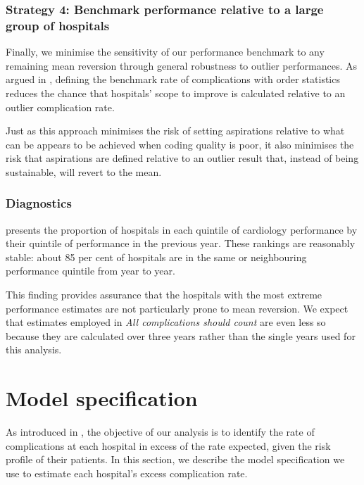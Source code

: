 \documentclass[submission]{grattan}
\newcommand*{\myTitle}{All complications should count}
\begin{document}
\subsubsection{Strategy 4: Benchmark performance relative to a large group of hospitals}\label{subsubsec:strategy-4-benchmark-performance-relative-to-a-large-group-of-hospitals}

Finally, we minimise the sensitivity of our performance benchmark to any remaining mean reversion through general robustness to outlier performances.
As argued in , defining the benchmark rate of complications with order statistics reduces the chance that hospitals' scope to improve is calculated relative to an outlier complication rate.

Just as this approach minimises the risk of setting aspirations relative to what can be appears to be achieved when coding quality is poor, it also minimises the risk that aspirations are defined relative to an outlier result that, instead of being sustainable, will revert to the mean.

\subsubsection{Diagnostics}\label{subsubsec:diagnostics}

 presents the proportion of hospitals in each quintile of cardiology performance by their quintile of performance in the previous year.
These rankings are reasonably stable: about 85 per cent of hospitals are in the same or neighbouring performance quintile from year to year.

This finding provides assurance that the hospitals with the most extreme performance estimates are not particularly prone to mean reversion.
We expect that estimates employed in \textit{\myTitle} are even less so because they are calculated over three years rather than the single years used for this analysis.

\section{Model specification}\label{sec:model-specification}

As introduced in , the objective of our analysis is to identify the rate of complications at each hospital in excess of the rate expected, given the risk profile of their patients.
In this section, we describe the model specification we use to estimate each hospital's excess complication rate.
\end{document}
